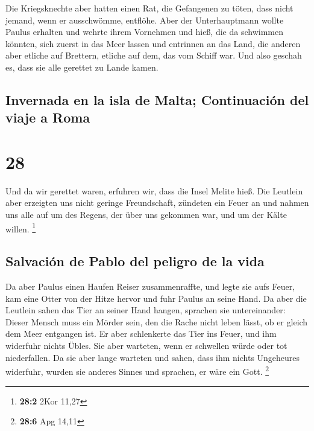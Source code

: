  Die Kriegsknechte aber hatten einen Rat, die Gefangenen
zu töten, dass nicht jemand, wenn er ausschwömme, entflöhe.
 Aber der Unterhauptmann wollte Paulus erhalten und
wehrte ihrem Vornehmen und hieß, die da schwimmen könnten, sich zuerst
in das Meer lassen und entrinnen an das Land,  die
anderen aber etliche auf Brettern, etliche auf dem, das vom Schiff war.
Und also geschah es, dass sie alle gerettet zu Lande kamen.

\hypertarget{invernada-en-la-isla-de-malta-continuaciuxf3n-del-viaje-a-roma}{%
\subsection{Invernada en la isla de Malta; Continuación del viaje a
Roma}\label{invernada-en-la-isla-de-malta-continuaciuxf3n-del-viaje-a-roma}}

\hypertarget{section-27}{%
\section{28}\label{section-27}}

 Und da wir gerettet waren, erfuhren wir, dass die Insel
Melite hieß.  Die Leutlein aber erzeigten uns nicht
geringe Freundschaft, zündeten ein Feuer an und nahmen uns alle auf um
des Regens, der über uns gekommen war, und um der Kälte willen.
\footnote{\textbf{28:2} 2Kor 11,27}

\hypertarget{salvaciuxf3n-de-pablo-del-peligro-de-la-vida}{%
\subsection{Salvación de Pablo del peligro de la
vida}\label{salvaciuxf3n-de-pablo-del-peligro-de-la-vida}}

 Da aber Paulus einen Haufen Reiser zusammenraffte, und
legte sie aufs Feuer, kam eine Otter von der Hitze hervor und fuhr
Paulus an seine Hand.  Da aber die Leutlein sahen das Tier
an seiner Hand hangen, sprachen sie untereinander: Dieser Mensch muss
ein Mörder sein, den die Rache nicht leben lässt, ob er gleich dem Meer
entgangen ist.  Er aber schlenkerte das Tier ins Feuer,
und ihm widerfuhr nichts Übles.  Sie aber warteten, wenn
er schwellen würde oder tot niederfallen. Da sie aber lange warteten und
sahen, dass ihm nichts Ungeheures widerfuhr, wurden sie anderes Sinnes
und sprachen, er wäre ein Gott. \footnote{\textbf{28:6} Apg 14,11}

